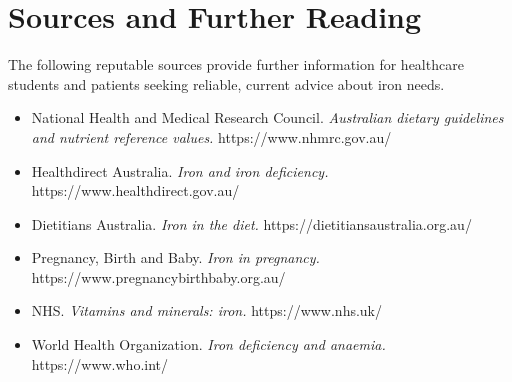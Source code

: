 \section*{Sources and Further Reading}
The following reputable sources provide further information for healthcare students and patients seeking reliable, current advice about iron needs.
\begin{itemize}
    \item National Health and Medical Research Council. \textit{Australian dietary guidelines and nutrient reference values.} https://www.nhmrc.gov.au/
    \item Healthdirect Australia. \textit{Iron and iron deficiency.} https://www.healthdirect.gov.au/
    \item Dietitians Australia. \textit{Iron in the diet.} https://dietitiansaustralia.org.au/
    \item Pregnancy, Birth and Baby. \textit{Iron in pregnancy.} https://www.pregnancybirthbaby.org.au/
    \item NHS. \textit{Vitamins and minerals: iron.} https://www.nhs.uk/
    \item World Health Organization. \textit{Iron deficiency and anaemia.} https://www.who.int/
\end{itemize}
